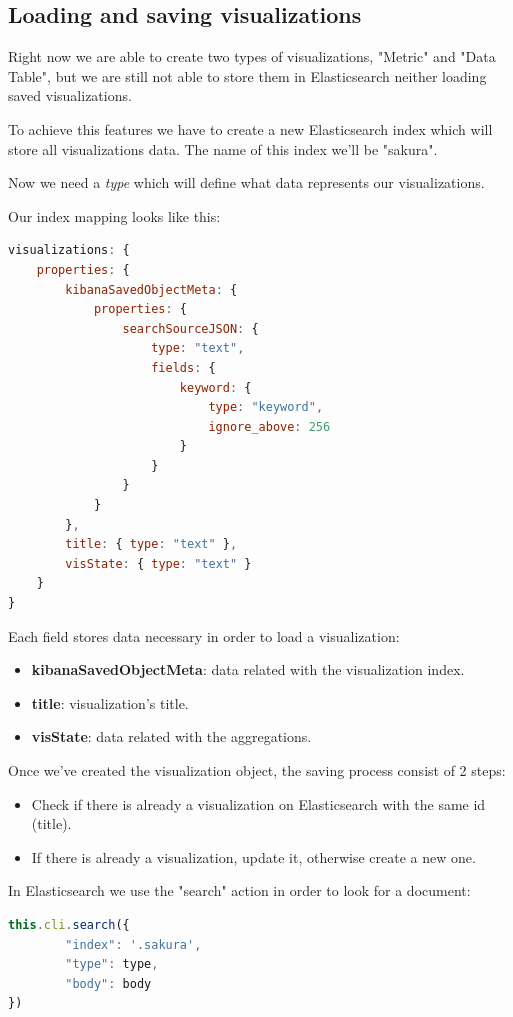 \documentclass[a4paper, 12pt, english]{book}
\begin{document}
\subsection{Loading and saving visualizations}
\label{sec:loading-and-saving}
Right now we are able to create two types of visualizations, "Metric" and "Data Table", but we are still not able to store them in Elasticsearch neither loading saved visualizations.

To achieve this features we have to create a new Elasticsearch index which will store all visualizations data. The name of this index we'll be "sakura".

Now we need a \textit{type} which will define what data represents our visualizations.

Our index mapping looks like this:
\begin{lstlisting}[language=javascript]
visualizations: {
    properties: {
        kibanaSavedObjectMeta: {
            properties: {
                searchSourceJSON: {
                    type: "text",
                    fields: {
                        keyword: {
                            type: "keyword",
                            ignore_above: 256
                        }
                    }
                }
            }
        },
        title: { type: "text" },
        visState: { type: "text" }
    }
}
\end{lstlisting}

Each field stores data necessary in order to load a visualization:
\begin{itemize}
    \item \textbf{kibanaSavedObjectMeta}: data related with the visualization index.
    \item \textbf{title}: visualization's title.
    \item \textbf{visState}: data related with the aggregations.
\end{itemize}

Once we've created the visualization object, the saving process consist of 2 steps:
\begin{itemize}
    \item Check if there is already a visualization on Elasticsearch with the same id (title).
    \item If there is already a visualization, update it, otherwise create a new one.
\end{itemize}

In Elasticsearch we use the "search" action in order to look for a document:
\begin{lstlisting}[language=javascript]
this.cli.search({
		"index": '.sakura',
		"type": type,
		"body": body
})
\end{lstlisting}
\end{document}
